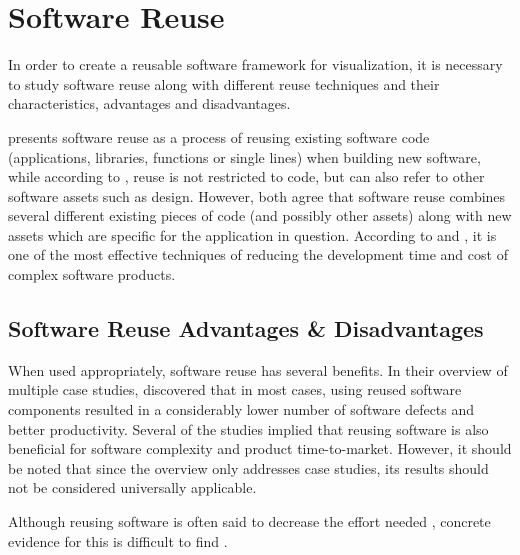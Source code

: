 
\chapter{Software Reuse}
\label{chapter:reuse}

In order to create a reusable software framework for visualization, it is necessary to study software reuse along with different reuse techniques and their characteristics, advantages and disadvantages.

\citet{krueger_software_1992} presents software reuse as a process of reusing existing software code (applications, libraries, functions or single lines) when building new software, while according to \citet{mohagheghi_empirical_2008}, reuse is not restricted to code, but can also refer to other software assets such as design. However, both agree that software reuse combines several different existing pieces of code (and possibly other assets) along with new assets which are specific for the application in question. According to \citet{mcilroy_mass-produced_1969} and \citet{boehm_managing_1999}, it is one of the most effective techniques of reducing the development time and cost of complex software products.

\section{Software Reuse Advantages \& Disadvantages}

When used appropriately, software reuse has several benefits. In their overview of multiple case studies, \citet{mohagheghi_empirical_2008} discovered that in most cases, using reused software components resulted in a considerably lower number of software defects and better productivity. Several of the studies implied that reusing software is also beneficial for software complexity and product time-to-market. However, it should be noted that since the overview only addresses case studies, its results should not be considered universally applicable.

Although reusing software is often said to decrease the effort needed \citep{mcilroy_mass-produced_1969, boehm_managing_1999, mohagheghi_empirical_2008}, concrete evidence for this is difficult to find \citep{mohagheghi_empirical_2008}.

